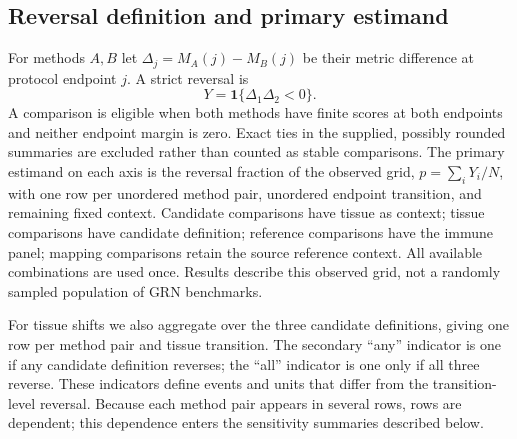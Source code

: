 \documentclass[10pt,letterpaper]{article}
\begin{document}
\subsection*{Reversal definition and primary estimand}
For methods $A,B$ let $\Delta_j=M_A(j)-M_B(j)$ be their metric difference at protocol endpoint $j$. A strict reversal is
\begin{equation}
Y=\mathbf{1}\{\Delta_1\Delta_2<0\}.
\end{equation}
A comparison is eligible when both methods have finite scores at both endpoints and neither endpoint margin is zero. Exact ties in the supplied, possibly rounded summaries are excluded rather than counted as stable comparisons. The primary estimand on each axis is the reversal fraction of the observed grid, $p=\sum_iY_i/N$, with one row per unordered method pair, unordered endpoint transition, and remaining fixed context. Candidate comparisons have tissue as context; tissue comparisons have candidate definition; reference comparisons have the immune panel; mapping comparisons retain the source reference context. All available combinations are used once. Results describe this observed grid, not a randomly sampled population of GRN benchmarks.

For tissue shifts we also aggregate over the three candidate definitions, giving one row per method pair and tissue transition. The secondary ``any'' indicator is one if any candidate definition reverses; the ``all'' indicator is one only if all three reverse. These indicators define events and units that differ from the transition-level reversal. Because each method pair appears in several rows, rows are dependent; this dependence enters the sensitivity summaries described below.
\end{document}
